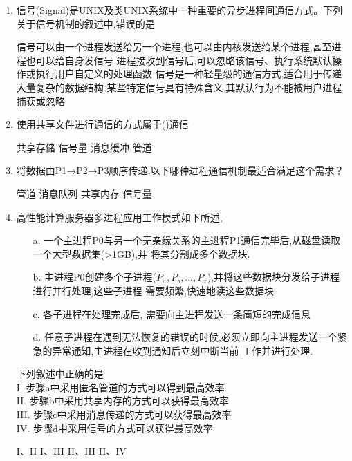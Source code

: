 \documentclass[12pt, a4paper, oneside, UTF8]{ctexbook}
\begin{document}
\begin{enumerate}
    \item 信号(Signal)是UNIX及类UNIX系统中一种重要的异步进程间通信方式。下列关于信号机制的叙述中,错误的是
    \begin{choices}[1]
    \task 信号可以由一个进程发送给另一个进程,也可以由内核发送给某个进程,甚至进程也可以给自身发信号
    \task 进程接收到信号后,可以忽略该信号、执行系统默认操作或执行用户自定义的处理函数
    \task 信号是一种轻量级的通信方式,适合用于传递大量复杂的数据结构
    \task 某些特定信号具有特殊含义,其默认行为不能被用户进程捕获或忽略
    \end{choices}


    \item 使用共享文件进行通信的方式属于()通信
    \begin{choices}[2]
    \task 共享存储
    \task 信号量
    \task 消息缓冲
    \task 管道
    \end{choices}


    \item 将数据由P1→P2→P3顺序传递,以下哪种进程通信机制最适合满足这个需求？
    \begin{choices}[2]
    \task 管道
    \task 消息队列
    \task 共享内存
    \task 信号量
    \end{choices}

    \item 高性能计算服务器多进程应用工作模式如下所述,
    \begin{enumerate}
        \item[a.] 一个主进程P0与另一个无亲缘关系的主进程P1通信完毕后,从磁盘读取一个大型数据集(>1GB),并
        将其分割成多个数据块.
        \item[b.] 主进程P0创建多个子进程($P_a,P_b,\ldots,P_z$),并将这些数据块分发给子进程进行并行处理,这些子进程
        需要频繁,快速地读这些数据块
        \item [c.] 各子进程在处理完成后, 需要向主进程发送一条简短的完成信息 
        \item [d.] 任意子进程在遇到无法恢复的错误的时候,必须立即向主进程发送一个紧急的异常通知,主进程在收到通知后立刻中断当前
        工作并进行处理. 
    \end{enumerate}
    下列叙述中正确的是\\
    I. 步骤a中采用匿名管道的方式可以得到最高效率\\
    II. 步骤b中采用共享内存的方式可以获得最高效率\\
    III. 步骤c中采用消息传递的方式可以获得最高效率\\
    IV. 步骤d中采用信号的方式可以获得最高效率
    \begin{choices}[2]
    \task I、II
    \task I、III
    \task II、III
    \task II、IV
    \end{choices}



\end{enumerate}
\end{document}
